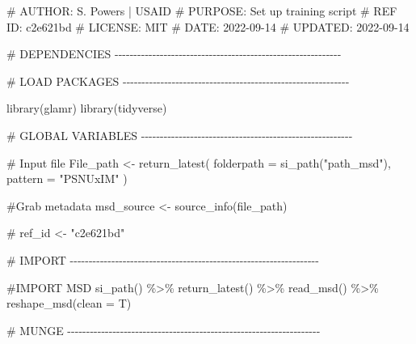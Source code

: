 \documentclass[
  letterpaper,
  DIV=11,
  numbers=noendperiod]{scrreprt}
\newenvironment{Shaded}{\begin{snugshade}}{\end{snugshade}}
\newcommand{\AttributeTok}[1]{\textcolor[rgb]{0.40,0.45,0.13}{#1}}
\newcommand{\CommentTok}[1]{\textcolor[rgb]{0.37,0.37,0.37}{#1}}
\newcommand{\FunctionTok}[1]{\textcolor[rgb]{0.28,0.35,0.67}{#1}}
\newcommand{\NormalTok}[1]{\textcolor[rgb]{0.00,0.23,0.31}{#1}}
\newcommand{\OtherTok}[1]{\textcolor[rgb]{0.00,0.23,0.31}{#1}}
\newcommand{\SpecialCharTok}[1]{\textcolor[rgb]{0.37,0.37,0.37}{#1}}
\newcommand{\StringTok}[1]{\textcolor[rgb]{0.13,0.47,0.30}{#1}}
\begin{document}
\begin{Shaded}
\begin{Highlighting}[]
\CommentTok{\# AUTHOR:   S. Powers | USAID}
\CommentTok{\# PURPOSE:  Set up training script}
\CommentTok{\# REF ID:   c2e621bd }
\CommentTok{\# LICENSE:  MIT}
\CommentTok{\# DATE:     2022{-}09{-}14}
\CommentTok{\# UPDATED:  2022{-}09{-}14}

\CommentTok{\# DEPENDENCIES {-}{-}{-}{-}{-}{-}{-}{-}{-}{-}{-}{-}{-}{-}{-}{-}{-}{-}{-}{-}{-}{-}{-}{-}{-}{-}{-}{-}{-}{-}{-}{-}{-}{-}{-}{-}{-}{-}{-}{-}{-}{-}{-}{-}{-}{-}{-}{-}{-}{-}{-}{-}{-}{-}{-}{-}{-}{-}{-}{-}}
  
\CommentTok{\# LOAD PACKAGES {-}{-}{-}{-}{-}{-}{-}{-}{-}{-}{-}{-}{-}{-}{-}{-}{-}{-}{-}{-}{-}{-}{-}{-}{-}{-}{-}{-}{-}{-}{-}{-}{-}{-}{-}{-}{-}{-}{-}{-}{-}{-}{-}{-}{-}{-}{-}{-}{-}{-}{-}{-}{-}{-}{-}{-}{-}{-}{-}{-}}

  \FunctionTok{library}\NormalTok{(glamr)}
  \FunctionTok{library}\NormalTok{(tidyverse)}
  

\CommentTok{\# GLOBAL VARIABLES {-}{-}{-}{-}{-}{-}{-}{-}{-}{-}{-}{-}{-}{-}{-}{-}{-}{-}{-}{-}{-}{-}{-}{-}{-}{-}{-}{-}{-}{-}{-}{-}{-}{-}{-}{-}{-}{-}{-}{-}{-}{-}{-}{-}{-}{-}{-}{-}{-}{-}{-}{-}{-}{-}{-}{-}}
    
  \CommentTok{\# Input file}
\NormalTok{  File\_path }\OtherTok{\textless{}{-}} \FunctionTok{return\_latest}\NormalTok{(}
    \AttributeTok{folderpath =} \FunctionTok{si\_path}\NormalTok{(}\StringTok{"path\_msd"}\NormalTok{), }
    \AttributeTok{pattern =} \StringTok{"PSNUxIM"}
\NormalTok{  )}

  \CommentTok{\#Grab metadata}
\NormalTok{  msd\_source }\OtherTok{\textless{}{-}} \FunctionTok{source\_info}\NormalTok{(file\_path)}
  
  \CommentTok{\# }
\NormalTok{  ref\_id }\OtherTok{\textless{}{-}} \StringTok{"c2e621bd"}

\CommentTok{\# IMPORT {-}{-}{-}{-}{-}{-}{-}{-}{-}{-}{-}{-}{-}{-}{-}{-}{-}{-}{-}{-}{-}{-}{-}{-}{-}{-}{-}{-}{-}{-}{-}{-}{-}{-}{-}{-}{-}{-}{-}{-}{-}{-}{-}{-}{-}{-}{-}{-}{-}{-}{-}{-}{-}{-}{-}{-}{-}{-}{-}{-}{-}{-}{-}{-}{-}{-}}
  
  \CommentTok{\#IMPORT MSD}
  \FunctionTok{si\_path}\NormalTok{() }\SpecialCharTok{\%\textgreater{}\%} 
    \FunctionTok{return\_latest}\NormalTok{() }\SpecialCharTok{\%\textgreater{}\%} 
    \FunctionTok{read\_msd}\NormalTok{() }\SpecialCharTok{\%\textgreater{}\%} 
    \FunctionTok{reshape\_msd}\NormalTok{(}\AttributeTok{clean =}\NormalTok{ T)}

\CommentTok{\# MUNGE {-}{-}{-}{-}{-}{-}{-}{-}{-}{-}{-}{-}{-}{-}{-}{-}{-}{-}{-}{-}{-}{-}{-}{-}{-}{-}{-}{-}{-}{-}{-}{-}{-}{-}{-}{-}{-}{-}{-}{-}{-}{-}{-}{-}{-}{-}{-}{-}{-}{-}{-}{-}{-}{-}{-}{-}{-}{-}{-}{-}{-}{-}{-}{-}{-}{-}{-}}
  

\end{Highlighting}
\end{Shaded}
\end{document}
